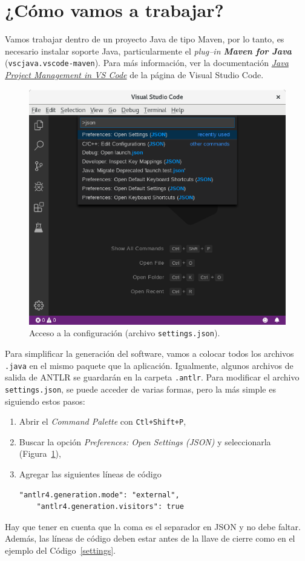 \section{¿Cómo vamos a trabajar?}

Vamos trabajar dentro de un proyecto Java de tipo Maven, por lo tanto, es necesario instalar soporte Java, particularmente el \emph{plug--in \textbf{Maven for Java}} (\verb|vscjava.vscode-maven|).  Para más información, ver la documentación \href{https://code.visualstudio.com/docs/java/java-project}{\emph{Java Project Management in VS Code}} de la página de Visual Studio Code.

\begin{figure}[p]
	\centering
	\includegraphics[width=.95\textwidth]{img/SelectJSON}
	\caption{Acceso a la configuración (archivo \texttt{settings.json}).}
	\label{preferences}
\end{figure}

Para simplificar la generación del software, vamos a colocar todos los archivos \verb|.java| en el mismo paquete que la aplicación.  Igualmente, algunos archivos de salida de ANTLR se guardarán en la carpeta \verb|.antlr|.  Para modificar el archivo \verb|settings.json|, se puede acceder de varias formas, pero la más simple es siguiendo estos pasos:
\begin{enumerate}
	\item Abrir el \emph{Command Palette} con \verb|Ctl+Shift+P|,
	\item Buscar la opción \emph{Preferences: Open Settings (JSON)} y seleccionarla (Figura~\ref{preferences}),
	\item Agregar las siguientes líneas de código
	\begin{lstlisting}[style=miJSON]
	"antlr4.generation.mode": "external",
	"antlr4.generation.visitors": true
	\end{lstlisting}
\end{enumerate}
Hay que tener en cuenta que la coma es el separador en JSON y no debe faltar.  Además, las líneas de código deben estar antes de la llave de cierre como en el ejemplo del Código~\ref{settings}.

